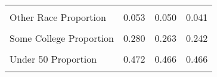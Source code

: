 \begin{table}[H]
\begin{tabular}[t]{lrrr}
\cellcolor{gray!6}{Not Married Proportion} & \cellcolor{gray!6}{0.374} & \cellcolor{gray!6}{0.362} & \cellcolor{gray!6}{0.373}\\
Other Race Proportion & 0.053 & 0.050 & 0.041\\
\addlinespace
\cellcolor{gray!6}{Over 50 Proportion} & \cellcolor{gray!6}{0.355} & \cellcolor{gray!6}{0.349} & \cellcolor{gray!6}{0.360}\\
Some College Proportion & 0.280 & 0.263 & 0.242\\
\cellcolor{gray!6}{Under 30 Proportion} & \cellcolor{gray!6}{0.173} & \cellcolor{gray!6}{0.186} & \cellcolor{gray!6}{0.175}\\
Under 50 Proportion & 0.472 & 0.466 & 0.466\\
\cellcolor{gray!6}{White Proportion} & \cellcolor{gray!6}{0.837} & \cellcolor{gray!6}{0.826} & \cellcolor{gray!6}{0.813}\\
\bottomrule
\end{tabular}
\end{table}
